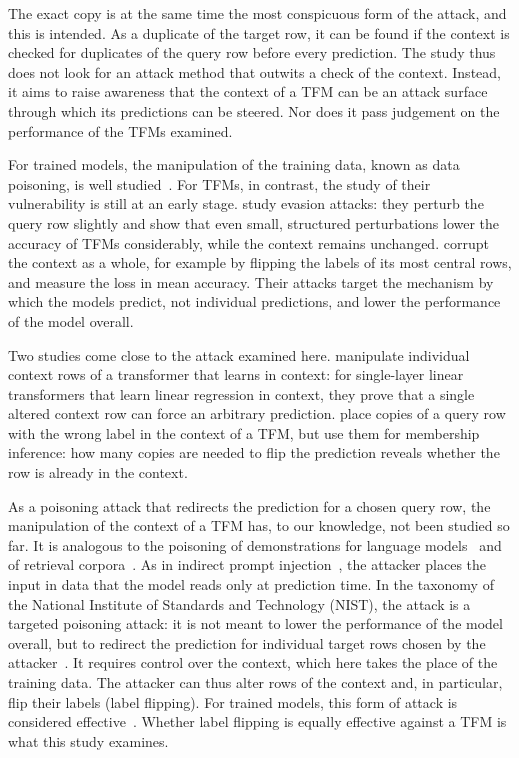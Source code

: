\documentclass[pdflatex,sn-mathphys-num]{sn-jnl}
\begin{document}
The exact copy is at the same time the most conspicuous form of the
attack, and this is intended. As a duplicate of the target row, it can
be found if the context is checked for duplicates of the query row
before every prediction. The study thus does not look for an attack
method that outwits a check of the context. Instead, it aims to raise
awareness that the context of a TFM can be an attack surface through
which its predictions can be steered. Nor does it pass judgement on the
performance of the TFMs examined.

For trained models, the manipulation of the training data, known as data
poisoning, is well studied~\citep{biggio2012, xiao2012, shafahi2018,
goldblum2023, cina2023, vassilev2025}. For TFMs, in contrast, the study
of their vulnerability is still at an early stage. \citet{djilani2026}
study evasion attacks: they perturb the query row slightly and show that
even small, structured perturbations lower the accuracy of TFMs
considerably, while the context remains unchanged. \citet{bilos2026}
corrupt the context as a whole, for example by flipping the labels of
its most central rows, and measure the loss in mean accuracy. Their
attacks target the mechanism by which the models predict, not individual
predictions, and lower the performance of the model overall.

Two studies come close to the attack examined here. \citet{anwar2025}
manipulate individual context rows of a transformer that learns in
context: for single-layer linear transformers that learn linear
regression in context, they prove that a single altered context row can
force an arbitrary prediction. \citet{wahdany2026} place copies of a
query row with the wrong label in the context of a TFM, but use them for
membership inference: how many copies are needed to flip the prediction
reveals whether the row is already in the context.

As a poisoning attack that redirects the prediction for a chosen query
row, the manipulation of the context of a TFM has, to our knowledge, not
been studied so far. It is analogous to the
poisoning of demonstrations for language
models~\citep{he2025} and of retrieval corpora~\citep{zou2025}. As in
indirect prompt injection~\citep{greshake2023}, the attacker places the
input in data that the model reads only at prediction time. In the
taxonomy of the National Institute of Standards and Technology (NIST),
the attack is a targeted poisoning attack: it is not meant to lower the
performance of the model overall, but to redirect the prediction for
individual target rows chosen by the attacker~\citep{vassilev2025}. It
requires control over the context, which here takes the place of the
training data. The attacker can thus alter rows of the context and, in
particular, flip their labels (label flipping). For trained models, this
form of attack is considered effective~\citep{vassilev2025}. Whether
label flipping is equally effective against a TFM is what this study
examines.
\end{document}
